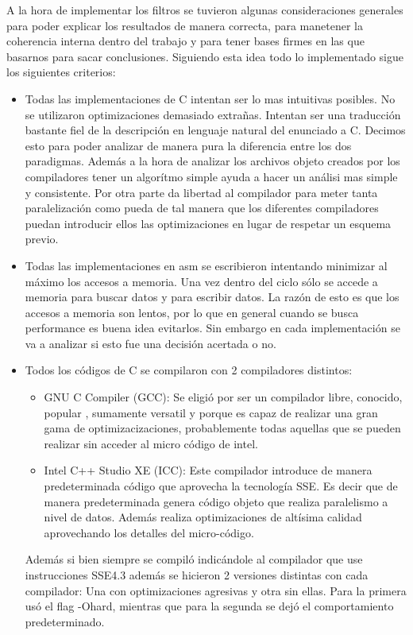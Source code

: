 	A la hora de implementar los filtros se tuvieron algunas consideraciones generales 
para poder explicar los resultados de manera correcta, para manetener la coherencia
interna dentro del trabajo y para tener bases firmes en las que basarnos para sacar
conclusiones.
	Siguiendo esta idea todo lo implementado sigue los siguientes criterios:
		\begin{itemize}
			\item Todas las implementaciones de C intentan ser lo mas intuitivas posibles. No se
			utilizaron optimizaciones demasiado extrañas. Intentan ser una traducción bastante
			fiel de la descripción en lenguaje natural del enunciado a C. Decimos esto para
			poder analizar de manera pura la diferencia entre los dos paradigmas. Además
			a la hora de analizar los archivos objeto creados por los compiladores
			tener un algorítmo simple ayuda a hacer un análisi mas simple y consistente.
			Por otra parte da libertad al compilador para meter tanta paralelización como pueda
			de tal manera que los diferentes compiladores puedan introducir ellos las optimizaciones
			en lugar de respetar un esquema previo.

			\item Todas las implementaciones en asm se escribieron intentando minimizar al máximo
			los accesos a memoria. Una vez dentro del ciclo sólo se accede a memoria para buscar
			datos y para escribir datos. La razón de esto es que los accesos a memoria son lentos,
			por lo que en general cuando se busca performance es buena idea evitarlos. Sin embargo
			en cada implementación se va a analizar si esto fue una decisión acertada o no.
			
			\item Todos los códigos de C se compilaron con 2 compiladores distintos:
				\begin{itemize}
					\item GNU C Compiler (GCC): Se eligió por ser un compilador libre, conocido, popular
					, sumamente versatil y porque es capaz de realizar una gran gama de optimizacizaciones, probablemente
					todas aquellas que se pueden realizar sin acceder al micro código de intel.

					\item Intel C++ Studio XE (ICC): Este compilador introduce de manera predeterminada código
					que aprovecha la tecnología SSE. Es decir que de manera predeterminada genera código objeto
					que realiza paralelismo a nivel de datos. Además realiza optimizaciones de altísima calidad
					aprovechando los detalles del micro-código.

				\end{itemize} 
				
			Además si bien siempre se compiló indicándole al compilador que use instrucciones SSE4.3 además
			se hicieron 2 versiones distintas con cada compilador: Una con optimizaciones agresivas y otra sin
			ellas. Para la primera usó el flag -Ohard, mientras que para la segunda se dejó el comportamiento
			predeterminado.

		\end{itemize}

